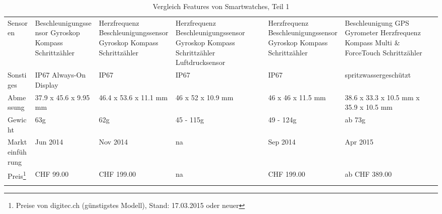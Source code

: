 \begin{landscape}
\begin{longtable}{p{2.8cm}p{3.5cm}p{3.5cm}p{3.5cm}p{3.5cm}p{3.5cm}}
	Sensoren
		& Beschleunigungssensor \newline
			Gyroskop \newline
			Kompass \newline
			Schrittzähler
		& Herzfrequenz \newline
        		Beschleunigungssensor \newline
			Gyroskop \newline
			Kompass \newline
			Schrittzähler
		& Herzfrequenz \newline
        		Beschleunigungssensor \newline
			Gyroskop \newline
			Kompass \newline
			Schrittzähler \newline
			Luftdrucksensor
		& Herzfrequenz \newline
		    Beschleunigungssensor \newline
			Gyroskop \newline
			Kompass \newline
			Schrittzähler
		& Beschleunigung \newline
			GPS \newline
			Gyrometer \newline
			Herzfrequenz \newline
			Kompass \newline
			Multi \& ForceTouch \newline
			Schrittzähler \\
	Sonstiges
		& IP67 \newline
			Always-On Display
		& IP67
		& IP67
		& IP67
		& spritzwassergeschützt \\
	Abmessung
		& 37.9 x 45.6 x 9.95 mm
		& 46.4 x 53.6 x 11.1 mm
		& 46 x 52 x 10.9 mm
		& 46 x 46 x 11.5 mm
		& 38.6 x 33.3 x 10.5 mm \newline
		42 x 35.9 x 10.5 mm\\
	Gewicht
		& 63g
		& 62g
		& 45 - 115g
		& 49 - 124g
		& ab 73g\\ 
	Markteinführung
		& Jun 2014
		& Nov 2014
		& na 
		& Sep 2014
		& Apr 2015\\
	Preis\footnote{Preise von digitec.ch (günstigstes Modell), Stand: 17.03.2015 oder neuer}
		& CHF 99.00
		& CHF 199.00
		& na
		& CHF 199.00
		& ab CHF 389.00 \\
	\hline
	\caption{Vergleich Features von Smartwatches, Teil 1} \\
\end{longtable}
\newpage


\end{landscape}
